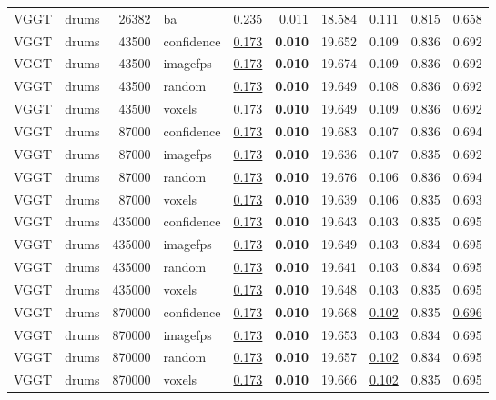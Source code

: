 \begin{table}[H]
\begin{tabular}{llrlrrrrrr}
VGGT & drums & 26382 & ba & 0.235 & \underline{0.011} & 18.584 & 0.111 & 0.815 & 0.658 \\
VGGT & drums & 43500 & confidence & \underline{0.173} & \textbf{0.010} & 19.652 & 0.109 & 0.836 & 0.692 \\
VGGT & drums & 43500 & imagefps & \underline{0.173} & \textbf{0.010} & 19.674 & 0.109 & 0.836 & 0.692 \\
VGGT & drums & 43500 & random & \underline{0.173} & \textbf{0.010} & 19.649 & 0.108 & 0.836 & 0.692 \\
VGGT & drums & 43500 & voxels & \underline{0.173} & \textbf{0.010} & 19.649 & 0.109 & 0.836 & 0.692 \\
VGGT & drums & 87000 & confidence & \underline{0.173} & \textbf{0.010} & 19.683 & 0.107 & 0.836 & 0.694 \\
VGGT & drums & 87000 & imagefps & \underline{0.173} & \textbf{0.010} & 19.636 & 0.107 & 0.835 & 0.692 \\
VGGT & drums & 87000 & random & \underline{0.173} & \textbf{0.010} & 19.676 & 0.106 & 0.836 & 0.694 \\
VGGT & drums & 87000 & voxels & \underline{0.173} & \textbf{0.010} & 19.639 & 0.106 & 0.835 & 0.693 \\
VGGT & drums & 435000 & confidence & \underline{0.173} & \textbf{0.010} & 19.643 & 0.103 & 0.835 & 0.695 \\
VGGT & drums & 435000 & imagefps & \underline{0.173} & \textbf{0.010} & 19.649 & 0.103 & 0.834 & 0.695 \\
VGGT & drums & 435000 & random & \underline{0.173} & \textbf{0.010} & 19.641 & 0.103 & 0.834 & 0.695 \\
VGGT & drums & 435000 & voxels & \underline{0.173} & \textbf{0.010} & 19.648 & 0.103 & 0.835 & 0.695 \\
VGGT & drums & 870000 & confidence & \underline{0.173} & \textbf{0.010} & 19.668 & \underline{0.102} & 0.835 & \underline{0.696} \\
VGGT & drums & 870000 & imagefps & \underline{0.173} & \textbf{0.010} & 19.653 & 0.103 & 0.834 & 0.695 \\
VGGT & drums & 870000 & random & \underline{0.173} & \textbf{0.010} & 19.657 & \underline{0.102} & 0.834 & 0.695 \\
VGGT & drums & 870000 & voxels & \underline{0.173} & \textbf{0.010} & 19.666 & \underline{0.102} & 0.835 & 0.695 \\
\bottomrule
\end{tabular}
\end{table}